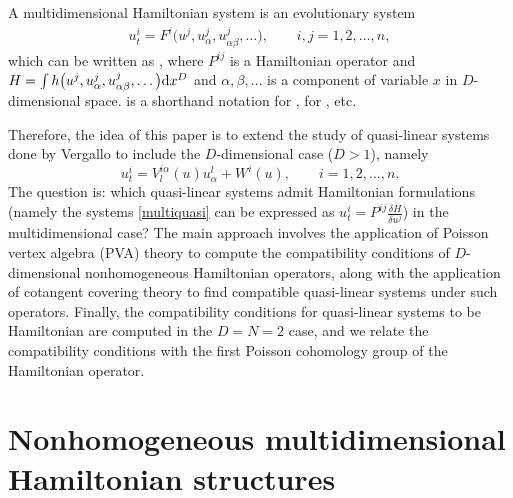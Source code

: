 \documentclass[10pt,a4paper]{amsart}
\numberwithin{equation}{section}
\begin{document}
A multidimensional Hamiltonian system is an evolutionary system
\begin{gather*}
u^i_t=F^i\big(u^j,u^j_\alpha,u^j_{\alpha\beta},\dots\big), \qquad i,j=1,2,\dots,n,
\end{gather*}
which can be written as , where $P^{ij}$ is a Hamiltonian operator and $H=\int h\big(u^j,u^j_\alpha,\allowbreak \smash{u^j_{\alpha\beta},\dots\big) {\rm d}x^D}$ and $\alpha ,\beta ,\dots$ is a component of variable $x$ in $D$-dimensional space.  is a shorthand notation for ,  for , etc.

Therefore, the idea of this paper is to extend the study of quasi-linear systems done by Vergallo to include the $D$-dimensional case ($D>1$), namely
\begin{equation}\label{multiquasi}
u^i_t=V^{i\alpha}_l(u)u^l_\alpha+W^i(u), \qquad i=1,2,\dots, n.
\end{equation}
The question is: which quasi-linear systems admit Hamiltonian formulations (namely the systems \eqref{multiquasi} can be expressed as $u^i_t=P^{ij}\frac{\delta H}{\delta u^j}$) in the multidimensional case? The main approach involves the application of Poisson vertex algebra (PVA) theory to compute the compatibility conditions of $D$-dimensional nonhomogeneous Hamiltonian operators, along with the application of cotangent covering theory to find compatible quasi-linear systems under such operators. Finally, the compatibility conditions for quasi-linear systems to be Hamiltonian are computed in the $D=N=2$ case, and we relate the compatibility conditions with the first Poisson cohomology group of the Hamiltonian operator.
\section{Nonhomogeneous multidimensional Hamiltonian structures}
\end{document}
